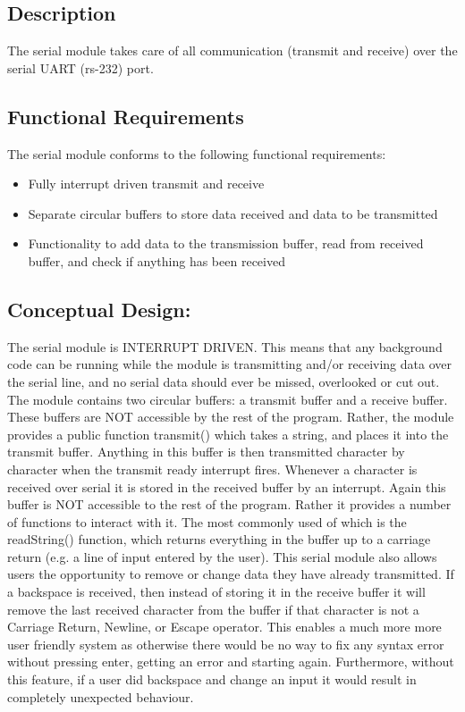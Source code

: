 \documentclass[]{report}
\begin{document}
\subsection{Description}
The serial module takes care of all communication (transmit and receive) over the serial UART (rs-232) port.

\subsection{Functional Requirements}
The serial module conforms to the following functional requirements:
\begin{itemize}
	\item Fully interrupt driven transmit and receive
	\item Separate circular buffers to store data received and data to be transmitted
	\item Functionality to add data to the transmission buffer, read from received buffer, and check if anything has been received
\end{itemize}

\subsection{Conceptual Design:}
The serial module is INTERRUPT DRIVEN. This means that any background code can be running while the module is transmitting and/or receiving data over the serial line, and no serial data should ever be missed, overlooked or cut out. \newline
The module contains two circular buffers: a transmit buffer and a receive buffer. These buffers are NOT accessible by the rest of the program. Rather, the module provides a public function transmit() which takes a string, and places it into the transmit buffer. Anything in this buffer is then transmitted character by character when the transmit ready interrupt fires. \newline
Whenever a character is received over serial it is stored in the received buffer by an interrupt. Again this buffer is NOT accessible to the rest of the program. Rather it provides a number of functions to interact with it. The most commonly used of which is the readString() function, which returns everything in the buffer up to a carriage return (e.g. a line of input entered by the user). \newline
This serial module also allows users the opportunity to remove or change data they have already transmitted. If a backspace is received, then instead of storing it in the receive buffer it will remove the last received character from the buffer if that character is not a Carriage Return, Newline, or Escape operator. This enables a much more more user friendly system as otherwise there would be no way to fix any syntax error without pressing enter, getting an error and starting again. Furthermore, without this feature, if a user did backspace and change an input it would result in completely unexpected behaviour.
\end{document}

